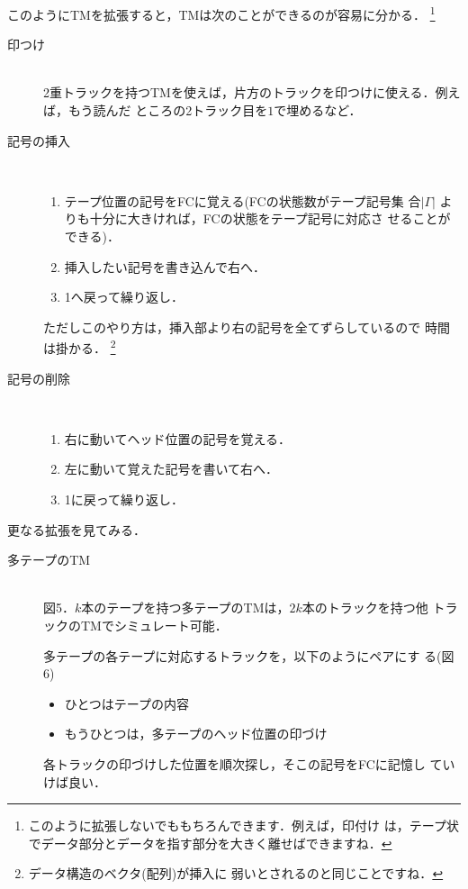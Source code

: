 このようにTMを拡張すると，TMは次のことができるのが容易に分かる．
\footnote{このように拡張しないでももちろんできます．例えば，印付け
は，テープ状でデータ部分とデータを指す部分を大きく離せばできますね．}

\begin{description}
 \item[印つけ] \mbox{} \\
            2重トラックを持つTMを使えば，片方のトラックを印つけに使える．例えば，もう読んだ
            ところの2トラック目を$1$で埋めるなど．
 \item[記号の挿入] \mbox{} \\
            \begin{enumerate}
             \item テープ位置の記号をFCに覚える(FCの状態数がテープ記号集
                   合$|\Gamma|$
                   よりも十分に大きければ，FCの状態をテープ記号に対応さ
                   せることができる)．
             \item 挿入したい記号を書き込んで右へ．
             \item 1へ戻って繰り返し．
            \end{enumerate}
            ただしこのやり方は，挿入部より右の記号を全てずらしているので
            時間は掛かる． \footnote{データ構造のベクタ(配列)が挿入に
            弱いとされるのと同じことですね．}
 \item[記号の削除] \mbox{} \\
            \begin{enumerate}
             \item 右に動いてヘッド位置の記号を覚える．
             \item 左に動いて覚えた記号を書いて右へ．
             \item 1に戻って繰り返し．
            \end{enumerate}
\end{description}

更なる拡張を見てみる．

\begin{description}
 \item[多テープのTM] \mbox{} \\
            図5．$k$本のテープを持つ多テープのTMは，$2k$本のトラックを持つ他
            トラックのTMでシミュレート可能．

            多テープの各テープに対応するトラックを，以下のようにペアにす
            る(図6)
            \begin{itemize}
             \item ひとつはテープの内容
             \item もうひとつは，多テープのヘッド位置の印づけ
            \end{itemize}
            各トラックの印づけした位置を順次探し，そこの記号をFCに記憶し
            ていけば良い．

            
\end{description}


